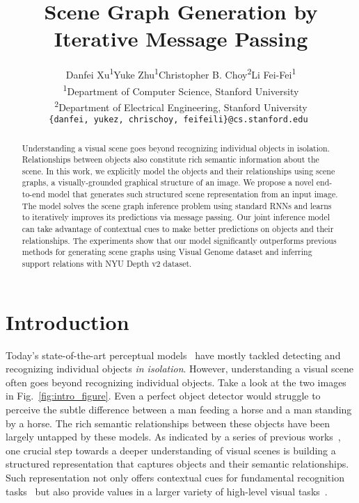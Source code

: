\documentclass[10pt,twocolumn,letterpaper]{article}
\begin{document}
\title{Scene Graph Generation by Iterative Message Passing}

\author{Danfei Xu\textsuperscript{1}\quad Yuke Zhu\textsuperscript{1}\quad Christopher B. Choy\textsuperscript{2}\quad Li Fei-Fei\textsuperscript{1}
	\\ \textsuperscript{1}Department of Computer Science, Stanford University
	\\ \textsuperscript{2}Department of Electrical Engineering, Stanford University
	\\ {\tt\small \{danfei, yukez, chrischoy, feifeili\}@cs.stanford.edu }
}


\maketitle
\begin{abstract}
Understanding a visual scene goes beyond recognizing individual objects in isolation. Relationships between objects also constitute rich semantic information about the scene. In this work, we explicitly model the objects and their relationships using scene graphs, a visually-grounded graphical structure of an image. We propose a novel end-to-end model that generates such structured scene representation from an input image. The model solves the scene graph inference problem using standard RNNs and learns to iteratively improves its predictions via message passing. Our joint inference model can take advantage of contextual cues to make better predictions on objects and their relationships. The experiments show that our model significantly outperforms previous methods for generating scene graphs using Visual Genome dataset and inferring support relations with NYU Depth v2 dataset.
\end{abstract}




\section{Introduction}
\label{sec:intro}

Today's state-of-the-art perceptual models~\cite{he2015deep,renNIPS15fasterrcnn} have mostly tackled detecting and recognizing individual objects \emph{in isolation}. However, understanding a visual scene often goes beyond recognizing individual objects. Take a look at the two images in Fig.~\ref{fig:intro_figure}. Even a perfect object detector would struggle to perceive the subtle difference between a man feeding a horse and a man standing by a horse. 
The rich semantic relationships between these objects have been largely untapped by these models. 
As indicated by a series of previous works~\cite{lu2016visual,sadeghi2011recognition,zhao2013scene}, one crucial step towards a deeper understanding of visual scenes is building a structured representation that captures objects and their semantic relationships.
Such representation not only offers contextual cues for fundamental recognition tasks~\cite{mottaghi2014role,oliva2007role,torralba2003contextual,yao2010modeling} but also provide values in a larger variety of high-level visual tasks~\cite{Johnson2015-lm,zitnick2013learning,yatskarsituation}.
\end{document}
